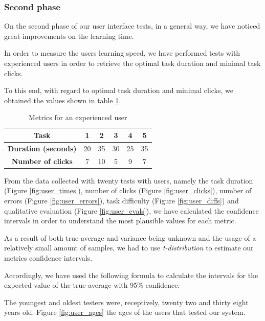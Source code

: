   \subsubsection {Second phase}

On the second phase of our user interface tests, in a general way, we have noticed great improvements on the learning time.

In order to measure the users learning speed, we have performed tests with experienced users in order to retrieve the optimal task duration and minimal task clicks.

To this end, with regard to optimal task duration and minimal clicks, we obtained the values shown in table \ref{table:optimal}.


\begin{table}[H]
\centering
\caption{Metrics for an experienced user}
\label{table:optimal}
\begin{tabular}{|c|c|c|c|c|c|}
\hline
\textbf{Task} & 1 & 2 & 3 & 4 & 5 \\ \hline
\textbf{Duration (seconds)} & 20 & 35 & 30 & 25 & 35 \\ \hline
\textbf{Number of clicks} & 7 & 10 & 5 & 9 & 7 \\ \hline
\end{tabular}
\end{table}


From the data collected with twenty tests with users, namely the task duration (Figure \ref{fig:user_times}), number of clicks (Figure \ref{fig:user_clicks}), number of errors (Figure \ref{fig:user_errors}), task difficulty (Figure \ref{fig:user_diffs}) and qualitative evaluation (Figure \ref{fig:user_evals}), we have calculated the confidence intervals in order to understand the most plausible values for each metric.

As a result of both true average and variance being unknown and the usage of a relatively small amount of samples, we had to use \emph{t-distribution} to estimate our metrics confidence intervals. 

Accordingly, we have used the following formula to calculate the intervals for the expected value of the true average with 95\% confidence:
\begin{equation}
[\bar{x}-F^{-1}_{t_{(n-1)}}(1-\alpha/2)\times \frac{s}{\sqrt{n}}, \bar{x}+F^{-1}_{t_{(n-1)}}(1-\alpha/2)\times \frac{s}{\sqrt{n}}]
\end{equation}

The youngest and oldest testers were, receptively, twenty two and thirty eight years old. Figure \ref{fig:user_ages} the ages of the users that tested our system.


